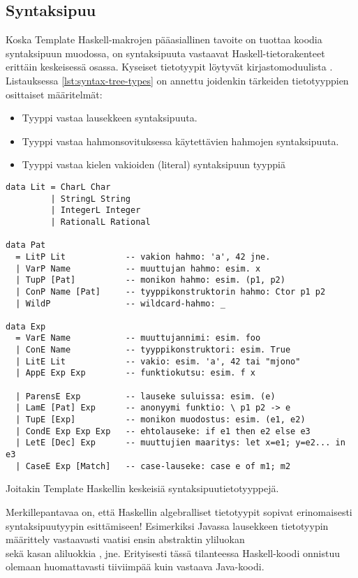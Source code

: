 \subsection{Syntaksipuu}
Koska Template Haskell-makrojen pääasiallinen tavoite on tuottaa koodia syntaksipuun muodossa,
on syntaksipuuta vastaavat Haskell-tietorakenteet erittäin keskeisessä osassa.
Kyseiset tietotyypit löytyvät kirjastomoduulista .
Listauksessa \ref{lst:syntax-tree-types} on annettu joidenkin tärkeiden tietotyyppien
osittaiset määritelmät:
\begin{itemize}
    \item Tyyppi  vastaa lausekkeen syntaksipuuta.
    \item Tyyppi  vastaa hahmonsovituksessa käytettävien hahmojen syntaksipuuta.
    \item Tyyppi  vastaa kielen vakioiden (literal) syntaksipuun tyyppiä
\end{itemize}

\begin{listing}[H]
\begin{verbatim}
data Lit = CharL Char
         | StringL String
         | IntegerL Integer
         | RationalL Rational

data Pat
  = LitP Lit            -- vakion hahmo: 'a', 42 jne.
  | VarP Name           -- muuttujan hahmo: esim. x
  | TupP [Pat]          -- monikon hahmo: esim. (p1, p2)
  | ConP Name [Pat]     -- tyyppikonstruktorin hahmo: Ctor p1 p2
  | WildP               -- wildcard-hahmo: _

data Exp
  = VarE Name           -- muuttujannimi: esim. foo
  | ConE Name           -- tyyppikonstruktori: esim. True
  | LitE Lit            -- vakio: esim. 'a', 42 tai "mjono"
  | AppE Exp Exp        -- funktiokutsu: esim. f x

  | ParensE Exp         -- lauseke suluissa: esim. (e)
  | LamE [Pat] Exp      -- anonyymi funktio: \ p1 p2 -> e
  | TupE [Exp]          -- monikon muodostus: esim. (e1, e2)
  | CondE Exp Exp Exp   -- ehtolauseke: if e1 then e2 else e3
  | LetE [Dec] Exp      -- muuttujien maaritys: let x=e1; y=e2... in e3
  | CaseE Exp [Match]   -- case-lauseke: case e of m1; m2
\end{verbatim}
\label{lst:syntax-tree-types}
\caption{Joitakin Template Haskellin keskeisiä syntaksipuutietotyyppejä.}
\end{listing}

Merkillepantavaa on,
että Haskellin algebralliset tietotyypit sopivat erinomaisesti syntaksipuutyypin esittämiseen!
Esimerkiksi Javassa lausekkeen tietotyypin määrittely vastaavasti vaatisi ensin abstraktin yliluokan \\
 sekä kasan aliluokkia ,
 jne.
Erityisesti tässä tilanteessa Haskell-koodi onnistuu olemaan huomattavasti tiiviimpää kuin vastaava Java-koodi.

